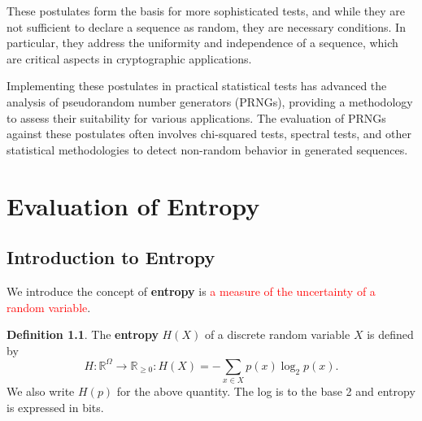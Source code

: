 \documentclass[12pt,openany]{book}
\theoremstyle{definition}
\newtheorem{definition}{Definition}[chapter]
\newcommand{\R}{\mathbb{R}}
\begin{document}
These postulates form the basis for more sophisticated tests, and while they are not sufficient to declare a sequence as random, they are necessary conditions. In particular, they address the uniformity and independence of a sequence, which are critical aspects in cryptographic applications.

Implementing these postulates in practical statistical tests has advanced the analysis of pseudorandom number generators (PRNGs), providing a methodology to assess their suitability for various applications. The evaluation of PRNGs against these postulates often involves chi-squared tests, spectral tests, and other statistical methodologies to detect non-random behavior in generated sequences.

\newpage
\chapter{Evaluation of Entropy}

\section{Introduction to Entropy}

We introduce the concept of \textbf{entropy} is \textcolor{red}{a measure of the uncertainty of a random variable}.
\\
\begin{tcolorbox}[colback=white,colframe=defcolor,arc=5pt,title={\color{white}\bf Entropy}]\begin{definition}
	The \textbf{entropy} \( H(X) \) of a discrete random variable \( X \) is defined by
	\[
	H:\R^{\Omega}\to\R_{\geq 0}:H(X) = -\sum_{x \in X} p(x) \log_2 p(x).
	\]
	We also write \( H(p) \) for the above quantity. The log is to the base 2 and entropy is expressed in bits.
\end{definition}
\end{tcolorbox}
\end{document}
